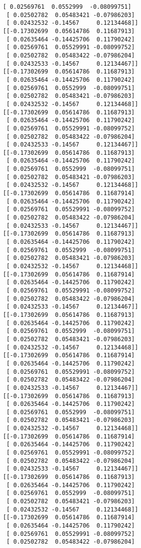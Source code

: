 \documentclass[11pt]{article}
\begin{document}
\begin{Verbatim}[commandchars=\\\{\}]
 [ 0.02569761  0.0552999  -0.08099751]
 [ 0.02502782  0.05483421 -0.07986203]
 [ 0.02432532 -0.14567     0.12134468]]
[[-0.17302699  0.05614786  0.11687913]
 [ 0.02635464 -0.14425706  0.11790242]
 [ 0.02569761  0.05529991 -0.08099752]
 [ 0.02502782  0.05483422 -0.07986204]
 [ 0.02432533 -0.14567     0.12134467]]
[[-0.17302699  0.05614786  0.11687913]
 [ 0.02635464 -0.14425706  0.11790242]
 [ 0.02569761  0.0552999  -0.08099751]
 [ 0.02502782  0.05483421 -0.07986203]
 [ 0.02432532 -0.14567     0.12134468]]
[[-0.17302699  0.05614786  0.11687913]
 [ 0.02635464 -0.14425706  0.11790242]
 [ 0.02569761  0.05529991 -0.08099752]
 [ 0.02502782  0.05483422 -0.07986204]
 [ 0.02432533 -0.14567     0.12134467]]
[[-0.17302699  0.05614786  0.11687913]
 [ 0.02635464 -0.14425706  0.11790242]
 [ 0.02569761  0.0552999  -0.08099751]
 [ 0.02502782  0.05483421 -0.07986203]
 [ 0.02432532 -0.14567     0.12134468]]
[[-0.17302699  0.05614786  0.11687914]
 [ 0.02635464 -0.14425706  0.11790242]
 [ 0.02569761  0.05529991 -0.08099752]
 [ 0.02502782  0.05483422 -0.07986204]
 [ 0.02432533 -0.14567     0.12134467]]
[[-0.17302699  0.05614786  0.11687913]
 [ 0.02635464 -0.14425706  0.11790242]
 [ 0.02569761  0.0552999  -0.08099751]
 [ 0.02502782  0.05483421 -0.07986203]
 [ 0.02432532 -0.14567     0.12134468]]
[[-0.17302699  0.05614786  0.11687914]
 [ 0.02635464 -0.14425706  0.11790242]
 [ 0.02569761  0.05529991 -0.08099752]
 [ 0.02502782  0.05483422 -0.07986204]
 [ 0.02432533 -0.14567     0.12134467]]
[[-0.17302699  0.05614786  0.11687913]
 [ 0.02635464 -0.14425706  0.11790242]
 [ 0.02569761  0.0552999  -0.08099751]
 [ 0.02502782  0.05483421 -0.07986203]
 [ 0.02432532 -0.14567     0.12134468]]
[[-0.17302699  0.05614786  0.11687914]
 [ 0.02635464 -0.14425706  0.11790242]
 [ 0.02569761  0.05529991 -0.08099752]
 [ 0.02502782  0.05483422 -0.07986204]
 [ 0.02432533 -0.14567     0.12134467]]
[[-0.17302699  0.05614786  0.11687913]
 [ 0.02635464 -0.14425706  0.11790242]
 [ 0.02569761  0.0552999  -0.08099751]
 [ 0.02502782  0.05483421 -0.07986203]
 [ 0.02432532 -0.14567     0.12134468]]
[[-0.17302699  0.05614786  0.11687914]
 [ 0.02635464 -0.14425706  0.11790242]
 [ 0.02569761  0.05529991 -0.08099752]
 [ 0.02502782  0.05483422 -0.07986204]
 [ 0.02432533 -0.14567     0.12134467]]
[[-0.17302699  0.05614786  0.11687913]
 [ 0.02635464 -0.14425706  0.11790242]
 [ 0.02569761  0.0552999  -0.08099751]
 [ 0.02502782  0.05483421 -0.07986203]
 [ 0.02432532 -0.14567     0.12134468]]
[[-0.17302699  0.05614786  0.11687914]
 [ 0.02635464 -0.14425706  0.11790242]
 [ 0.02569761  0.05529991 -0.08099752]
 [ 0.02502782  0.05483422 -0.07986204]

\end{Verbatim}
\end{document}
